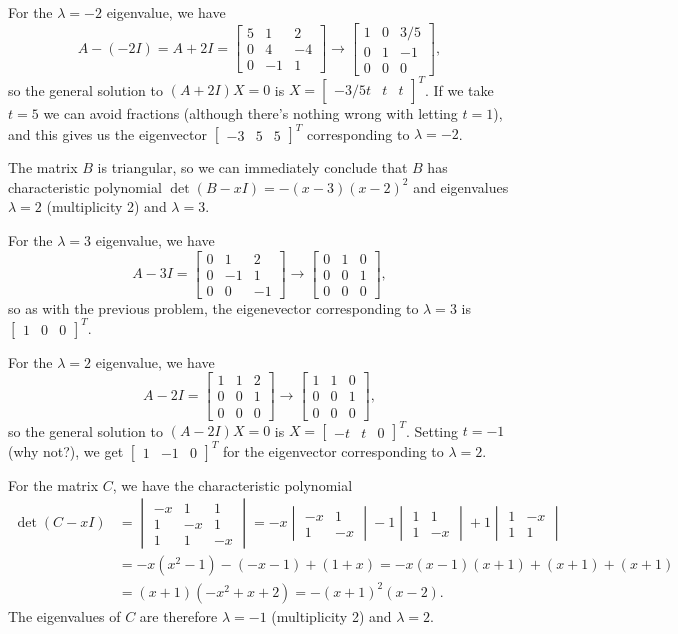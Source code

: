 \documentclass[12pt]{article}
\newcommand{\bbm}{\begin{bmatrix}}
\newcommand{\ebm}{\end{bmatrix}}
\newcommand{\bvm}{\begin{vmatrix}}
\newcommand{\evm}{\end{vmatrix}}
\begin{document}
\begin{enumerate}
For the $\lambda = -2$ eigenvalue, we have
\[
 A-(-2I) = A+2I = \bbm 5&1&2\\0&4&-4\\0&-1&1\ebm \longrightarrow \bbm 1&0&3/5\\0&1&-1\\0&0&0\ebm,
\]
so the general solution to $(A+2I)X=0$ is $X = \bbm -3/5t &t&t\ebm^T$. If we take $t=5$ we can avoid fractions (although there's nothing wrong with letting $t=1$), and this gives us the eigenvector $\bbm -3&5&5\ebm^T$ corresponding to $\lambda = -2$.

\bigskip

\bigskip

The matrix $B$ is triangular, so we can immediately conclude that $B$ has characteristic polynomial $\det(B-xI) = -(x-3)(x-2)^2$ and eigenvalues $\lambda =2$ (multiplicity 2) and $\lambda=3$.

For the $\lambda=3$ eigenvalue, we have
\[
 A-3I = \bbm 0&1&2\\0&-1&1\\0&0&-1\ebm \longrightarrow \bbm 0&1&0\\0&0&1\\0&0&0\ebm,
\]
so as with the previous problem, the eigenevector corresponding to $\lambda = 3$ is $\bbm 1&0&0\ebm^T$.

For the $\lambda=2$ eigenvalue, we have
\[
 A-2I = \bbm 1&1&2\\0&0&1\\0&0&0\ebm \longrightarrow \bbm 1&1&0\\0&0&1\\0&0&0\ebm,
\]
so the general solution to $(A-2I)X=0$ is $X=\bbm -t&t&0\ebm^T$. Setting $t=-1$ (why not?), we get $\bbm 1&-1&0\ebm^T$ for the eigenvector corresponding to $\lambda=2$.

\bigskip

\bigskip

For the matrix $C$, we have the characteristic polynomial
\begin{align*}
 \det(C-xI) & = \bvm -x&1&1\\1&-x&1\\1&1&-x\evm = -x\bvm -x&1\\1&-x\evm -1\bvm 1&1\\1&-x\evm+1\bvm 1&-x\\1&1\evm\\
& = -x(x^2-1)-(-x-1)+(1+x) = -x(x-1)(x+1)+(x+1)+(x+1)\\
& = (x+1)(-x^2+x+2) = -(x+1)^2(x-2).
\end{align*}
The eigenvalues of $C$ are therefore $\lambda = -1$ (multiplicity 2) and $\lambda =2$.


\end{enumerate}
\end{document}
